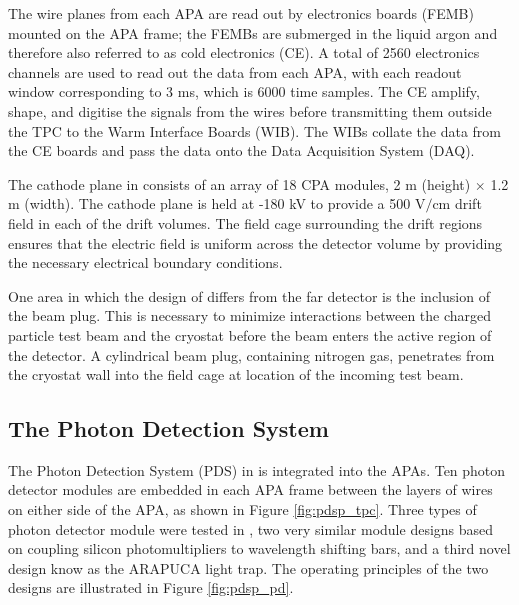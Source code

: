 The wire planes from each APA are read out by electronics boards (FEMB) 
mounted on the APA frame; the FEMBs are submerged in the liquid argon 
and therefore also referred to as cold electronics (CE). A total of 2560 
electronics channels are used to read out the data from each APA, with each
readout window corresponding to 3 ms, which is 6000 time samples. The CE 
amplify, shape, and digitise the signals from the wires before transmitting 
them outside the TPC to the Warm Interface Boards (WIB). The WIBs collate the 
data from the CE boards and pass the data onto the Data Acquisition System 
(DAQ).

The cathode plane in \protodune{} consists of an array of 18 CPA modules, 2 m 
(height) $\times$ 1.2 m (width). The cathode plane is held at -180 kV to 
provide a 500 $\mbox{V/cm}$ drift field in each of the drift volumes. The 
field cage surrounding the drift regions ensures that the electric field is 
uniform across the detector volume by providing the necessary electrical
boundary conditions.

One area in which the design of \protodune{} differs from the far detector is
the inclusion of the beam plug. This is necessary to minimize interactions
between the charged particle test beam and the cryostat before the beam enters 
the active region of the detector. A cylindrical beam plug, containing 
nitrogen gas, penetrates from the cryostat wall into the field cage at 
location of the incoming test beam. 

\subsection{The Photon Detection System}

The Photon Detection System (PDS) in \protodune{} is integrated into the APAs. 
Ten photon detector modules are embedded in each APA frame between the layers 
of wires on either side of the APA, as shown in Figure \ref{fig:pdsp_tpc}. 
Three types of photon detector module were tested in \protodune{}, two very 
similar module designs based on coupling silicon photomultipliers to 
wavelength shifting bars, and a third novel design know as the ARAPUCA light 
trap. The operating principles of the two designs are illustrated in Figure 
\ref{fig:pdsp_pd}.

